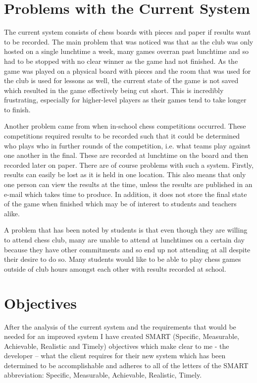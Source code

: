 \documentclass[twoside, 12pt]{report}
\begin{document}
\section{Problems with the Current System}
The current system consists of chess boards with pieces and paper if results want to be recorded. The main problem that was noticed was that as the club was only hosted on a single lunchtime a week, many games overran past lunchtime and so had to be stopped with no clear winner as the game had not finished. As the game was played on a physical board with pieces and the room that was used for the club is used for lessons as well, the current state of the game is not saved which resulted in the game effectively being cut short. This is incredibly frustrating, especially for higher-level players as their games tend to take longer to finish. 

Another problem came from when in-school chess competitions occurred. These competitions required results to be recorded such that it could be determined who plays who in further rounds of the competition, i.e. what teams play against one another in the final. These are recorded at lunchtime on the board and then recorded later on paper. There are of course problems with such a system. Firstly, results can easily be lost as it is held in one location. This also means that only one person can view the results at the time, unless the results are published in an e-mail which takes time to produce. In addition, it does not store the final state of the game when finished which may be of interest to students and teachers alike.

A problem that has been noted by students is that even though they are willing to attend chess club, many are unable to attend at lunchtimes on a certain day because they have other commitments and so end up not attending at all despite their desire to do so. Many students would like to be able to play chess games outside of club hours amongst each other with results recorded at school.
\section{Objectives} \label{objectives}
After the analysis of the current system and the requirements that would be needed for an improved system I have created SMART (Specific, Measurable, Achievable, Realistic and Timely) objectives which make clear to me - the developer – what the client requires for their new system which has been determined to be accomplishable and adheres to all of the letters of the SMART abbreviation: Specific, Measurable, Achievable, Realistic, Timely.
\end{document}
